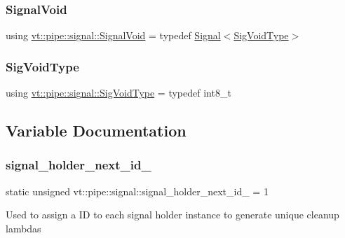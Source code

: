 \subsubsection{\texorpdfstring{Signal\+Void}{SignalVoid}}
{\footnotesize\ttfamily using \hyperlink{namespacevt_1_1pipe_1_1signal_ac80a6a95b9545fa65856842a88ac6087}{vt\+::pipe\+::signal\+::\+Signal\+Void} = typedef \hyperlink{structvt_1_1pipe_1_1signal_1_1_signal}{Signal}$<$\hyperlink{namespacevt_1_1pipe_1_1signal_acbe257d1ae44f20fa9fd9b6ed3057caf}{Sig\+Void\+Type}$>$}

\mbox{\label{namespacevt_1_1pipe_1_1signal_acbe257d1ae44f20fa9fd9b6ed3057caf}} 
\subsubsection{\texorpdfstring{Sig\+Void\+Type}{SigVoidType}}
{\footnotesize\ttfamily using \hyperlink{namespacevt_1_1pipe_1_1signal_acbe257d1ae44f20fa9fd9b6ed3057caf}{vt\+::pipe\+::signal\+::\+Sig\+Void\+Type} = typedef int8\+\_\+t}



\subsection{Variable Documentation}
\mbox{\label{namespacevt_1_1pipe_1_1signal_ac8886465cfa962750b7fbec87ca9d5bc}} 
\subsubsection{\texorpdfstring{signal\+\_\+holder\+\_\+next\+\_\+id\+\_\+}{signal\_holder\_next\_id\_}}
{\footnotesize\ttfamily static unsigned vt\+::pipe\+::signal\+::signal\+\_\+holder\+\_\+next\+\_\+id\+\_\+ = 1}

Used to assign a ID to each signal holder instance to generate unique cleanup lambdas 